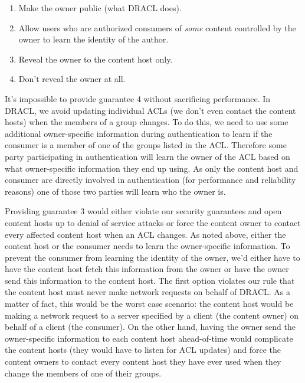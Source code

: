 \documentclass[pdftex,12pt,a4papaer]{report}
\begin{document}
\begin{compactenum}
\begin{enumerate}
\item Make the owner public (what DRACL does).
\item Allow users who are authorized consumers of \emph{some} content controlled
  by the owner to learn the identity of the author.
\item Reveal the owner to the content host only.
\item Don't reveal the owner at all.
\end{enumerate}

It's impossible to provide guarantee 4 without sacrificing performance. In
DRACL, we avoid updating individual ACLs (we don't even contact the content
hosts) when the members of a group changes. To do this, we need to use some
additional owner-specific information during authentication to learn if the
consumer is a member of one of the groups listed in the ACL\@. Therefore some
party participating in authentication will learn the owner of the ACL based on
what owner-specific information they end up using. As only the content host and
consumer are directly involved in authentication (for performance and
reliability reasons) one of those two parties will learn who the owner is.

Providing guarantee 3 would either violate our security guarantees and open
content hosts up to denial of service attacks or force the content owner to
contact every affected content host when an ACL changes. As noted above, either
the content host or the consumer needs to learn the owner-specific information.
To prevent the consumer from learning the identity of the owner, we'd either
have to have the content host fetch this information from the owner or have the
owner send this information to the content host. The first option violates our
rule that the content host must never make network requests on behalf of DRACL\@.
As a matter of fact, this would be the worst case scenario: the content host
would be making a network request to a server specified by a client (the content
owner) on behalf of a client (the consumer). On the other hand, having the owner
send the owner-specific information to each content host ahead-of-time would
complicate the content hosts (they would have to listen for ACL updates) and
force the content owners to contact every content host they have ever used when
they change the members of one of their groups.


\end{compactenum}
\end{document}
